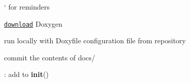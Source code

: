 
\begin{DoxyRefList}
\item[\label{todo__todo000052}%
\Hypertarget{todo__todo000052}%
Page \hyperlink{md__r_e_a_d_m_e}{Mu\+MoT} ]` for reminders
\begin{DoxyItemize}
\item \href{http://www.stack.nl/~dimitri/doxygen/download.html}{\tt download} Doxygen
\item run locally with {\ttfamily Doxyfile} configuration file from repository
\item commit the contents of {\ttfamily docs/} 
\end{DoxyItemize}
\item[\label{todo__todo000044}%
\Hypertarget{todo__todo000044}%
Global \hyperlink{class_mu_mo_t_1_1_mu_mo_tbifurcation_view_a797e92fe19ce2636a49bf1400a69fc49}{Mu\+Mo\+Tbifurcation\+View.\+\_\+py\+D\+Scont} ]\+: add to {\bfseries init}() 


\end{DoxyRefList}
